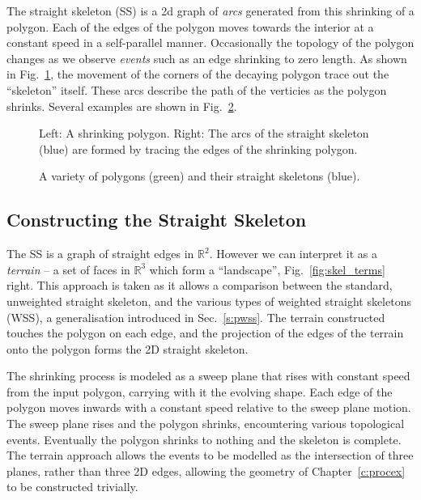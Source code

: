 The straight skeleton (SS) is a 2d graph of \emph{arcs} generated from this shrinking of a polygon. Each of the edges of the polygon moves towards the interior at a constant speed in a self-parallel manner. Occasionally the topology of the polygon changes as we observe \emph{events} such as an edge shrinking to zero length. As shown in Fig.~\ref{fig:skel_shrink}, the movement of the corners of the decaying polygon trace out the ``skeleton'' itself. These arcs describe the path of the verticies as the polygon shrinks. Several examples are shown in Fig.~\ref{fig:skel_examples}.

\begin{figure}
  \centering
  \def\svgwidth{0.7\columnwidth}
  
  \caption[Shrinking a polygon to form the straight skeleton]{\label{fig:skel_shrink}Left: A shrinking polygon. Right: The arcs of the straight skeleton (blue) are formed by tracing the edges of the shrinking polygon.}
\end{figure}


\begin{figure}
  \centering
  \def\svgwidth{1.0\columnwidth}
  
  \caption[The straight skeleton of various polygons]{\label{fig:skel_examples}A variety of polygons (green) and their straight skeletons (blue).}
\end{figure}


\subsection{Constructing the Straight Skeleton}
\label{sec:constring_skeletons}

The SS is a graph of straight edges in $\mathbb{R}^2$. However we can interpret it as a \emph{terrain} -- a set of faces in $\mathbb{R}^3$ which form a ``landscape''\cite{Aichholzer95}, Fig.~\ref{fig:skel_terms} right. This approach is taken as it allows a comparison between the standard, unweighted straight skeleton, and the various types of weighted straight skeletons (WSS), a generalisation introduced in Sec.~\ref{s:pwss}.
The terrain constructed touches the polygon on each edge, and the projection of the edges of the terrain onto the polygon forms the 2D straight skeleton. 

The shrinking process is modeled as a sweep plane that rises with constant speed from the input polygon, carrying with it the evolving shape. Each edge of the polygon moves inwards with a constant speed relative to the sweep plane motion. The sweep plane rises and the polygon shrinks, encountering various topological events. Eventually the polygon shrinks to nothing and the skeleton is complete. The terrain approach allows the events to be modelled as the intersection of three planes, rather than three 2D edges, allowing the geometry of Chapter~\ref{c:procex} to be constructed trivially.

